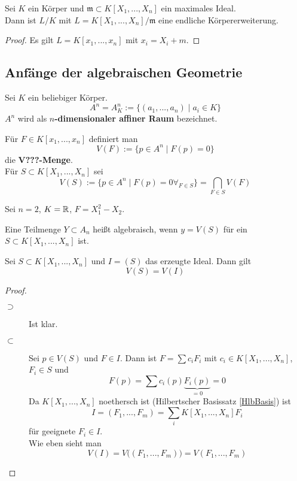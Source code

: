 	\begin{satz}
		Sei $K$ ein Körper und $\mathfrak m\subset K[X_1,...,X_n]$ ein maximales Ideal.\\
		Dann ist $L/K$ mit $L=K[X_1,...,X_n]/\mathfrak m$ eine endliche Körpererweiterung.
	\end{satz}
	\begin{proof}
		Es gilt $L=K[x_1,...,x_n]$ mit $x_i=X_i+m$.
	\end{proof}




	\subsection{Anfänge der algebraischen Geometrie}
	
	\begin{definition}
		Sei $K$ ein beliebiger Körper.
		\[A^n=A_K^n:=\{(a_1,...,a_n)\mid a_i\in K\}\]
		$A^n$ wird als \textbf{$n$-dimensionaler affiner Raum} bezeichnet.\\
	\end{definition}
	\begin{definition}
		Für $F\in K[x_1,...,x_n]$ definiert man
		\[V(F):=\{p\in A^n\mid F(p)=0\}\]
		die \textbf{V???-Menge}.\\ %
		Für $S\subset K[X_1,...,X_n]$ sei
		\[V(S):=\{p\in A^n\mid F(p)=0\forall_{F\in S}\}=\bigcap_{F\in S}V(F)\]
	\end{definition}

	\begin{exm}
		Sei $n=2$, $K=\mathbb{R}$, $F=X^2_1-X_2$.
	\end{exm}

	\begin{definition}
		Eine Teilmenge $Y\subset A_n$ heißt algebraisch, wenn $y=V(S)$ für ein $S\subset K[X_1,...,X_n]$ ist.
	\end{definition}

	\begin{satz}
		Sei $S\subset K[X_1,...,X_n]$ und $I=(S)$ das erzeugte Ideal. Dann gilt
		\[V(S)=V(I)\]
	\end{satz}
	\begin{proof}
		\begin{description}
			\item[$\supset$] Ist klar.
			\item[$\subset$] Sei $p\in V(S)$ und $F\in I$. Dann ist $F=\sum c_iF_i$ mit $c_i\in K[X_1,...,X_n]$, $F_i\in S$ und
			\[F(p)=\sum c_i(p)\underbrace{F_i(p)}_{=0}=0\]
			Da $K[X_1,...,X_n]$ noethersch ist (Hilbertscher Basissatz \ref{HlbBasis}) ist
			\[I=(F_1,...,F_m)=\sum_i K[X_1,...,X_n]F_i\]
			für geeignete $F_i\in I$.\\
			Wie eben sieht man 
			\[V(I)=V\big((F_1,...,F_m)\big)=V(F_1,...,F_m)\]
		\end{description}
	\end{proof}
	
